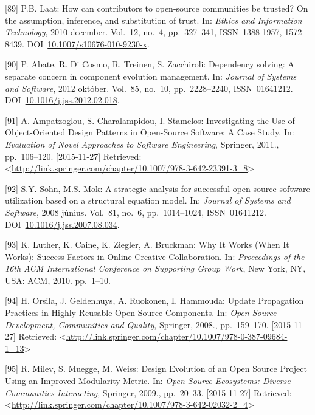 \documentclass[12pt,magyar,a4paper,oneside]{scrreprt}
\begin{document}
\leavevmode\hypertarget{ref-laat_how_2010}{}%
{[}89{]} P.B. Laat: How can contributors to open-source communities be
trusted? On the assumption, inference, and substitution of trust. In:
\emph{Ethics and Information Technology}, 2010 december. Vol.~12, no.~4,
pp.~327--341, ISSN~1388-1957, 1572-8439.
DOI~\href{https://doi.org/10.1007/s10676-010-9230-x}{10.1007/s10676-010-9230-x}.

\leavevmode\hypertarget{ref-abate_dependency_2012}{}%
{[}90{]} P. Abate, R. Di Cosmo, R. Treinen, S. Zacchiroli: Dependency
solving: A separate concern in component evolution management. In:
\emph{Journal of Systems and Software}, 2012 október. Vol.~85, no.~10,
pp.~2228--2240, ISSN~01641212.
DOI~\href{https://doi.org/10.1016/j.jss.2012.02.018}{10.1016/j.jss.2012.02.018}.

\leavevmode\hypertarget{ref-ampatzoglou_investigating_2011}{}%
{[}91{]} A. Ampatzoglou, S. Charalampidou, I. Stamelos: Investigating
the Use of Object-Oriented Design Patterns in Open-Source Software: A
Case Study. In: \emph{Evaluation of Novel Approaches to Software
Engineering}, Springer, 2011., pp.~106--120. {[}2015-11-27{]} Retrieved:
\textless{}\url{http://link.springer.com/chapter/10.1007/978-3-642-23391-3_8}\textgreater{}

\leavevmode\hypertarget{ref-sohn_strategic_2008}{}%
{[}92{]} S.Y. Sohn, M.S. Mok: A strategic analysis for successful open
source software utilization based on a structural equation model. In:
\emph{Journal of Systems and Software}, 2008 június. Vol.~81, no.~6,
pp.~1014--1024, ISSN~01641212.
DOI~\href{https://doi.org/10.1016/j.jss.2007.08.034}{10.1016/j.jss.2007.08.034}.

\leavevmode\hypertarget{ref-luther_why_2010}{}%
{[}93{]} K. Luther, K. Caine, K. Ziegler, A. Bruckman: Why It Works
(When It Works): Success Factors in Online Creative Collaboration. In:
\emph{Proceedings of the 16th ACM International Conference on Supporting
Group Work}, New York, NY, USA: ACM, 2010. pp.~1--10.

\leavevmode\hypertarget{ref-orsila_update_2008}{}%
{[}94{]} H. Orsila, J. Geldenhuys, A. Ruokonen, I. Hammouda: Update
Propagation Practices in Highly Reusable Open Source Components. In:
\emph{Open Source Development, Communities and Quality}, Springer,
2008., pp.~159--170. {[}2015-11-27{]} Retrieved:
\textless{}\url{http://link.springer.com/chapter/10.1007/978-0-387-09684-1_13}\textgreater{}

\leavevmode\hypertarget{ref-milev_design_2009}{}%
{[}95{]} R. Milev, S. Muegge, M. Weiss: Design Evolution of an Open
Source Project Using an Improved Modularity Metric. In: \emph{Open
Source Ecosystems: Diverse Communities Interacting}, Springer, 2009.,
pp.~20--33. {[}2015-11-27{]} Retrieved:
\textless{}\url{http://link.springer.com/chapter/10.1007/978-3-642-02032-2_4}\textgreater{}
\end{document}
